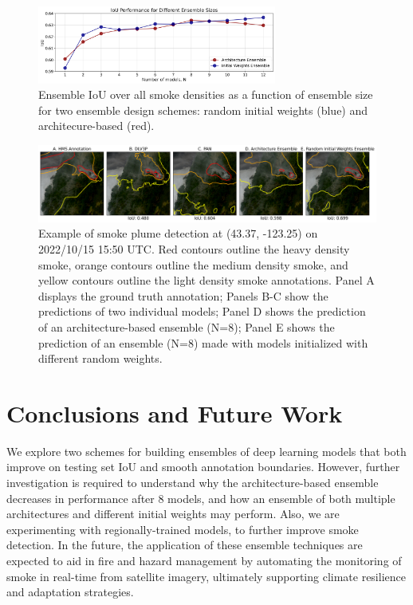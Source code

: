 \documentclass{article}
\begin{document}
\begin{figure}
    \centering
    \includegraphics[width=0.70\textwidth]{ensemble_size_plot.png}
    \caption{\RaggedRight Ensemble IoU over all smoke densities as a function of ensemble size for two ensemble design schemes: random initial weights (blue) and architecure-based (red).}
    \label{fig:ensemble_size_plot}
\end{figure}
\begin{figure}[h]
    \centering
    \includegraphics[width=\textwidth]{ensemble_panel_tinypaper.png}
    \caption{Example of smoke plume detection at (43.37, -123.25) on 2022/10/15 15:50 UTC. Red contours outline the heavy density smoke, orange contours outline the medium density smoke, and yellow contours outline the light density smoke annotations. Panel A displays the ground truth annotation; Panels B-C show the predictions of two individual models; Panel D shows the prediction of an architecture-based ensemble (N=8); Panel E shows the prediction of an ensemble (N=8) made with models initialized with different random weights.}
    \label{fig:ensemble_panel}
\end{figure}
\section{Conclusions and Future Work} We explore two schemes for building ensembles of deep learning models that both improve on testing set IoU and smooth annotation boundaries. However, further investigation is required to understand why the architecture-based ensemble decreases in performance after 8 models, and how an ensemble of both multiple architectures and different initial weights may perform. Also, we are experimenting with regionally-trained models, to further improve smoke detection. In the future, the application of these ensemble techniques are expected to aid in fire and hazard management by automating the monitoring of smoke in real-time from satellite imagery, ultimately supporting climate resilience and adaptation strategies. 


\end{document}
